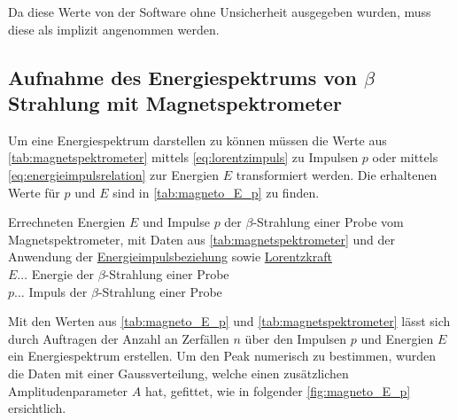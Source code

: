 \documentclass[12pt,english,ngerman]{scrartcl}
\begin{document}
Da diese Werte von der Software ohne Unsicherheit ausgegeben wurden, muss diese
als implizit angenommen werden.

\subsection{Aufnahme des Energiespektrums von \texorpdfstring{$\beta$}{beta}
	Strahlung mit Magnetspektrometer}

Um eine Energiespektrum darstellen zu können müssen die Werte aus
\autoref{tab:magnetspektrometer} mittels \autoref{eq:lorentzimpuls} zu Impulsen
$p$ oder mittels \autoref{eq:energieimpulsrelation} zur Energien $E$
transformiert werden. Die erhaltenen Werte für $p$ und $E$ sind in
\autoref{tab:magneto_E_p} zu finden.

\begin{table}[H]
	\caption[Energie- und Impulswerte der $\beta$-Strahlung einer  Probe]{
		Errechneten Energien $E$ und Impulse $p$ der $\beta$-Strahlung einer
		 Probe vom Magnetspektrometer, mit Daten aus
		\autoref{tab:magnetspektrometer} und der Anwendung der
		\hyperref[eq:energieimpulsrelation]{Energieimpulsbeziehung} sowie
		\hyperref[eq:lorentzimpuls]{Lorentzkraft}                                                          \\
		$E \dots$ Energie der $\beta$-Strahlung einer  Probe \\
		$p \dots$ Impuls der $\beta$-Strahlung einer  Probe  \\
	}\label{tab:magneto_E_p}
	\centering
	
\end{table}

Mit den Werten aus \autoref{tab:magneto_E_p} und
\autoref{tab:magnetspektrometer} lässt sich durch Auftragen der Anzahl an
Zerfällen $n$ über den Impulsen $p$ und Energien $E$ ein Energiespektrum
erstellen. Um den Peak numerisch zu bestimmen, wurden die Daten mit einer
Gaussverteilung, welche einen zusätzlichen Amplitudenparameter $A$ hat,
gefittet, wie in folgender \autoref{fig:magneto_E_p} ersichtlich.
\end{document}

